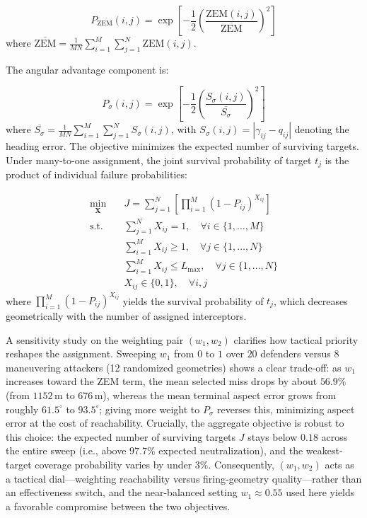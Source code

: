 \documentclass[lettersize,journal]{IEEEtran}
\newcommand{\hladd}[1]{{\color{blue}#1}}
\begin{document}
\begin{equation}
\label{eq:zem_prob}
P_{\text{ZEM}}(i,j) = \exp\left[-\frac{1}{2}\left(\frac{\text{ZEM}(i,j)}{\overline{\text{ZEM}}}\right)^2\right]
\end{equation}
where $\overline{\text{ZEM}} = \frac{1}{MN}\sum_{i=1}^{M}\sum_{j=1}^{N} \text{ZEM}(i,j)$.

The angular advantage component is:

\begin{equation}
\label{eq:angular_prob}
P_{\sigma}(i,j) = \exp\left[-\frac{1}{2}\left(\frac{S_{\sigma}(i,j)}{\overline{S_{\sigma}}}\right)^2\right]
\end{equation}
where $\overline{S_{\sigma}} = \frac{1}{MN}\sum_{i=1}^{M}\sum_{j=1}^{N} S_{\sigma}(i,j)$, with $S_{\sigma}(i,j) = |\gamma_{ij} - q_{ij}|$ denoting the heading error. The objective minimizes the expected number of surviving targets. Under many-to-one assignment, the joint survival probability of target $t_j$ is the product of individual failure probabilities:

\begin{equation}
\label{eq:optimization_formulation}
\begin{aligned}
\min_{\mathbf{X}} \quad & J = \sum_{j=1}^{N} \left[ \prod_{i=1}^{M} \left(1 - P_{ij}\right)^{X_{ij}} \right] \\
\text{s.t.} \quad & \sum_{j=1}^{N} X_{ij} = 1, \quad \forall i \in \{1,\dots,M\} \\
& \sum_{i=1}^{M} X_{ij} \geq 1, \quad \forall j \in \{1,\dots,N\} \\
& \sum_{i=1}^{M} X_{ij} \leq L_{\max}, \quad \forall j \in \{1,\dots,N\} \\
& X_{ij} \in \{0,1\}, \quad \forall i,j
\end{aligned}
\end{equation}
where $\prod_{i=1}^{M} (1 - P_{ij})^{X_{ij}}$ yields the survival probability of $t_j$, which decreases geometrically with the number of assigned interceptors.

\hladd{A sensitivity study on the weighting pair $(w_1,w_2)$ clarifies how tactical priority reshapes the assignment. Sweeping $w_1$ from $0$ to $1$ over $20$ defenders versus $8$ maneuvering attackers (12 randomized geometries) shows a clear trade-off: as $w_1$ increases toward the ZEM term, the mean selected miss drops by about $56.9\%$ (from $1152$\,m to $676$\,m), whereas the mean terminal aspect error grows from roughly $61.5^{\circ}$ to $93.5^{\circ}$; giving more weight to $P_{\sigma}$ reverses this, minimizing aspect error at the cost of reachability. Crucially, the aggregate objective is robust to this choice: the expected number of surviving targets $J$ stays below $0.18$ across the entire sweep (i.e., above $97.7\%$ expected neutralization), and the weakest-target coverage probability varies by under $3\%$. Consequently, $(w_1,w_2)$ acts as a tactical dial---weighting reachability versus firing-geometry quality---rather than an effectiveness switch, and the near-balanced setting $w_1 \approx 0.55$ used here yields a favorable compromise between the two objectives.}
\end{document}
